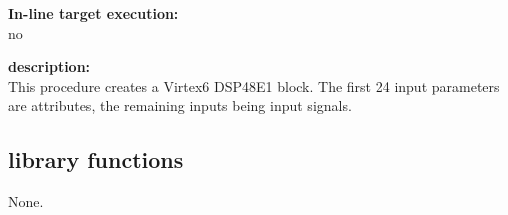             {\bf In-line target execution:} \\
            no

            {\bf description:} \\
            This procedure creates a Virtex6 DSP48E1 block. The first 24 input
            parameters are attributes, the remaining inputs being input signals.




    \subsection{library functions}
    
        None.






